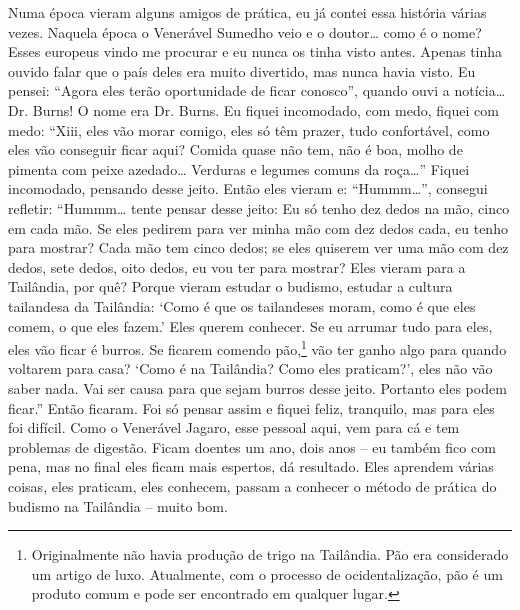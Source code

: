 Numa época vieram alguns amigos de prática, eu já contei essa
história várias vezes. Naquela época o Venerável Sumedho veio e o
doutor… como é o nome? Esses europeus vindo me procurar e eu nunca os
tinha visto antes. Apenas tinha ouvido falar que o país deles era muito
divertido, mas nunca havia visto. Eu pensei: “Agora eles terão
oportunidade de ficar conosco”, quando ouvi a notícia… Dr. Burns! O
nome era Dr. Burns. Eu fiquei incomodado, com medo, fiquei com medo:
“Xiii, eles vão morar comigo, eles só têm prazer, tudo confortável,
como eles vão conseguir ficar aqui? Comida quase não tem, não é boa,
molho de pimenta com peixe azedado… Verduras e legumes comuns da roça…”
Fiquei incomodado, pensando desse jeito. Então eles vieram e: “Hummm…”,
consegui refletir: “Hummm… tente pensar desse jeito: Eu só tenho dez
dedos na mão, cinco em cada mão. Se eles pedirem para ver minha mão com
dez dedos cada, eu tenho para mostrar? Cada mão tem cinco dedos; se
eles quiserem ver uma mão com dez dedos, sete dedos, oito dedos, eu vou
ter para mostrar? Eles vieram para a Tailândia, por quê? Porque vieram
estudar o budismo, estudar a cultura tailandesa da Tailândia: ‘Como é
que os tailandeses moram, como é que eles comem, o que eles fazem.’
Eles querem conhecer. Se eu arrumar tudo para eles, eles vão ficar é
burros. Se ficarem comendo pão,\footnote{Originalmente não havia
produção de trigo na Tailândia. Pão era considerado um artigo de luxo.
Atualmente, com o processo de ocidentalização, pão é um produto comum e
pode ser encontrado em qualquer lugar.} vão ter ganho algo para quando
voltarem para casa? ‘Como é na Tailândia? Como eles praticam?’, eles
não vão saber nada. Vai ser causa para que sejam burros desse jeito.
Portanto eles podem ficar.” Então ficaram. Foi só pensar assim e fiquei
feliz, tranquilo, mas para eles foi difícil. Como o Venerável Jagaro,
esse pessoal aqui, vem para cá e tem problemas de digestão. Ficam
doentes um ano, dois anos – eu também fico com pena, mas no final eles
ficam mais espertos, dá resultado. Eles aprendem várias coisas, eles
praticam, eles conhecem, passam a conhecer o método de prática do
budismo na Tailândia – muito bom. 

